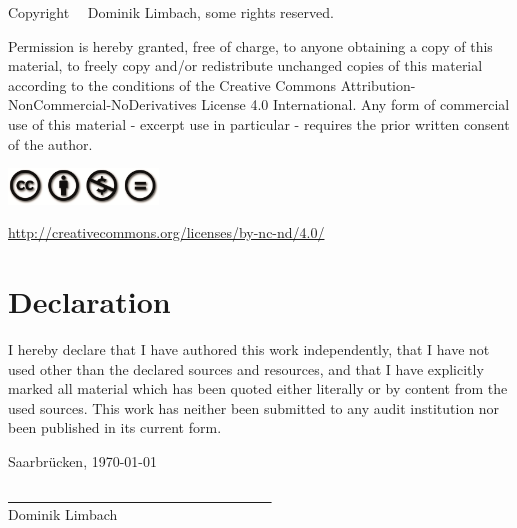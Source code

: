 \documentclass[
    12pt,
    a4paper,
	chapterprefix=false,
	parskip=full,
	headings=normal,
	numbers=noenddot
]{scrreprt}
\begin{document}
\vspace*{\fill}
\small
\begin{center}

Copyright \textcopyright \ \the\year \ Dominik Limbach, some rights reserved.
	
\begin{minipage}{0.85\textwidth}
Permission is hereby granted, free of charge, to anyone obtaining a copy of this material, to freely copy and/or redistribute unchanged copies of this material according to the conditions of the Creative Commons Attribution-NonCommercial-NoDerivatives License 4.0 International. Any form of commercial use of this material - excerpt use in particular - requires the prior written consent of the author.
\end{minipage}
	
\includegraphics[width=4cm]{images/cc_by_nc_nd}
	
\href{http://creativecommons.org/licenses/by-nc-nd/4.0/}{http://creativecommons.org/licenses/by-nc-nd/4.0/}

\end{center}
\normalsize
\thispagestyle{empty}
\clearpage

\newpage

\chapter*{Declaration}

I hereby declare that I have authored this work independently, that I have not used other than the declared sources and resources, and that I have explicitly marked all material which has been quoted either literally or by content from the used sources. This work has neither been submitted to any audit institution nor been published in its current form.\\

\vspace{1cm}

Saarbrücken, \today\\

\vspace{1.5cm}

\underline{~ ~ ~ ~ ~ ~ ~ ~ ~ ~ ~ ~ ~ ~ ~ ~ ~ ~ ~ ~ ~ ~ ~}\\
\small
Dominik Limbach
\normalsize
\end{document}
